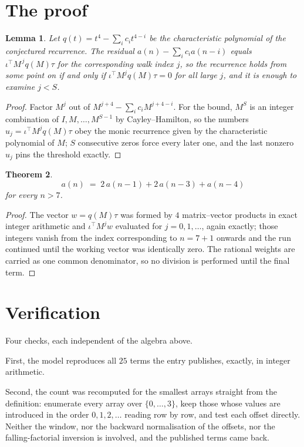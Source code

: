 \documentclass[11pt,a4paper]{article}
\theoremstyle{plain}
\newtheorem{theorem}{Theorem}
\newtheorem{lemma}[theorem]{Lemma}
\theoremstyle{definition}
\begin{document}
\section{The proof}

\begin{lemma}\label{lem:crit}
Let $q(t)=t^{4}-\sum_i c_it^{4-i}$ be the characteristic polynomial of the
conjectured recurrence. The residual $a(n)-\sum_ic_ia(n-i)$ equals
$\iota^{\!\top}M^{\,j}q(M)\tau$ for the corresponding walk index $j$, so the recurrence
holds from some point on if and only if $\iota^{\!\top}M^{j}q(M)\tau=0$ for all large $j$,
and it is enough to examine $j<S$.
\end{lemma}

\begin{proof}
Factor $M^{j}$ out of $M^{j+4}-\sum_ic_iM^{j+4-i}$. For the bound, $M^{S}$
is an integer combination of $I,M,\dots,M^{S-1}$ by Cayley--Hamilton, so the numbers
$u_j=\iota^{\!\top}M^{j}q(M)\tau$ obey the monic recurrence given by the characteristic
polynomial of $M$; $S$ consecutive zeros force every later one, and the last nonzero $u_j$
pins the threshold exactly.
\end{proof}

\begin{theorem}
\[
a(n)\;=\;2\,a(n-1) + 2\,a(n-3) + a(n-4)
\]
for every $n>7$.
\end{theorem}

\begin{proof}
The vector $w=q(M)\tau$ was formed by $4$ matrix--vector products in exact integer
arithmetic and $\iota^{\!\top}M^{j}w$ evaluated for $j=0,1,\dots$, again exactly; those
integers vanish from the index corresponding to $n=7+1$ onwards and the run continued
until the working vector was identically zero. The rational weights are carried as one common
denominator, so no division is performed until the final term.
\end{proof}

\section{Verification}

Four checks, each independent of the algebra above.

First, the model reproduces all $25$ terms the entry publishes, exactly, in integer
arithmetic.

Second, the count was recomputed for the smallest arrays straight from the definition:
enumerate every array over $\{0,\dots,3\}$, keep those whose values are introduced in the
order $0,1,2,\dots$ reading row by row, and test each offset directly. Neither the window, nor
the backward normalisation of the offsets, nor the falling-factorial inversion is involved, and
the published terms came back.
\end{document}
